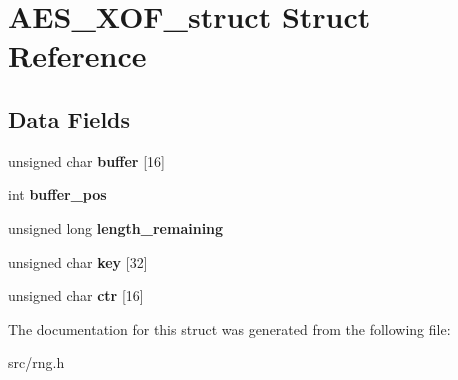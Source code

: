 \hypertarget{structAES__XOF__struct}{}\section{A\+E\+S\+\_\+\+X\+O\+F\+\_\+struct Struct Reference}
\label{structAES__XOF__struct}
\subsection*{Data Fields}
\begin{DoxyCompactItemize}
\item 
\mbox{\label{structAES__XOF__struct_a0dccd2463f4520272e9c7cde8a9a1cc1}} 
unsigned char {\bfseries buffer} \mbox{[}16\mbox{]}
\item 
\mbox{\label{structAES__XOF__struct_a04e9673c4aa42b5de3c4bc21e640544c}} 
int {\bfseries buffer\+\_\+pos}
\item 
\mbox{\label{structAES__XOF__struct_a4400350c04e5e05c124b8e7a42d51aab}} 
unsigned long {\bfseries length\+\_\+remaining}
\item 
\mbox{\label{structAES__XOF__struct_af6c77acc5b67da8a5d9424022a6801c7}} 
unsigned char {\bfseries key} \mbox{[}32\mbox{]}
\item 
\mbox{\label{structAES__XOF__struct_abddd02f31b49f037543ee2726eae552b}} 
unsigned char {\bfseries ctr} \mbox{[}16\mbox{]}
\end{DoxyCompactItemize}


The documentation for this struct was generated from the following file\+:\begin{DoxyCompactItemize}
\item 
src/rng.\+h\end{DoxyCompactItemize}

